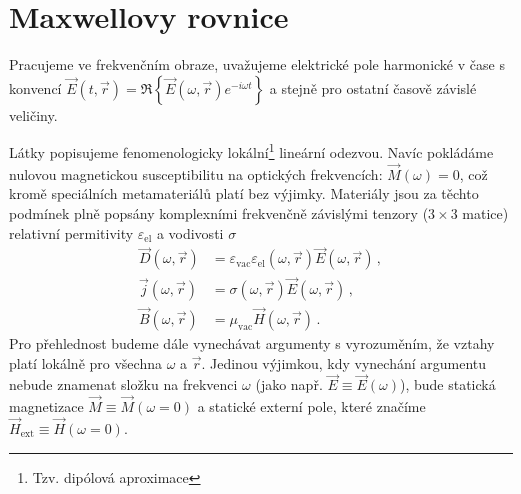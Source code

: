 \section{Maxwellovy rovnice}
\label{chap:maxwellovy-rovnice}

Pracujeme ve frekvenčním obraze, uvažujeme elektrické pole harmonické v čase s konvencí $\vec{E}(t,\vec{r})=\Re\left\lbrace\vec{E}(\omega,\vec{r}) e^{-i\omega t}\right\rbrace$ a stejně pro ostatní časově závislé veličiny.

Látky popisujeme fenomenologicky lokální\footnote{Tzv. dipólová aproximace} lineární odezvou.
Navíc pokládáme nulovou magnetickou susceptibilitu na optických frekvencích: $\vec{M}(\omega)=0$, což kromě speciálních metamateriálů platí bez výjimky.
Materiály jsou za těchto podmínek plně popsány komplexními frekvenčně závislými tenzory ($3\times 3$ matice) relativní permitivity $\varepsilon_{\textrm{el}}$ a vodivosti $\sigma$
\begin{align}
    \vec{D}(\omega,\vec{r})&=\varepsilon_{\textrm{vac}} \varepsilon_{\textrm{el}}(\omega,\vec{r})\vec{E}(\omega,\vec{r}) \,, \label{eqn:materialy-D} \\
    \vec{j}(\omega,\vec{r})&=\sigma(\omega,\vec{r})\vec{E}(\omega,\vec{r}) \,, \label{eqn:materialy-J} \\
    \vec{B}(\omega,\vec{r})&=\mu_{\textrm{vac}} \vec{H}(\omega,\vec{r})  \,. \label{eqn:materialy-B}
\end{align}
Pro přehlednost budeme dále vynechávat argumenty s vyrozuměním, že vztahy platí lokálně pro všechna $\omega$ a $\vec{r}$.
Jedinou výjimkou, kdy vynechání argumentu nebude znamenat složku na frekvenci $\omega$ (jako např. $\vec{E}\equiv\vec{E}(\omega)$), bude statická magnetizace $\vec{M}\equiv\vec{M}(\omega=0)$ a statické externí pole, které značíme $\vec{H}_{\textrm{ext}}\equiv\vec{H}(\omega=0)$.

